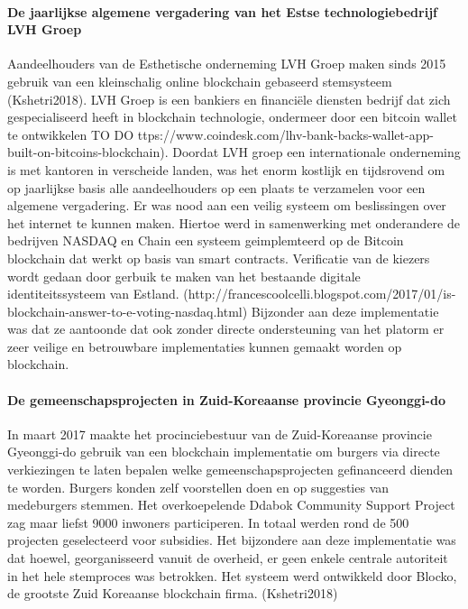 				\paragraph{De jaarlijkse algemene vergadering van het Estse technologiebedrijf LVH Groep}
				Aandeelhouders van de Esthetische onderneming LVH Groep maken sinds 2015 gebruik van een kleinschalig online blockchain gebaseerd stemsysteem (Kshetri2018). LVH Groep is een bankiers en financiële diensten bedrijf dat zich gespecialiseerd heeft in blockchain technologie, ondermeer door een bitcoin wallet te ontwikkelen TO DO ttps://www.coindesk.com/lhv-bank-backs-wallet-app-built-on-bitcoins-blockchain). Doordat LVH groep een internationale onderneming is met kantoren in verscheide landen, was het enorm kostlijk en tijdsrovend om op jaarlijkse basis alle aandeelhouders op een plaats te verzamelen voor een algemene vergadering. Er was  nood aan een veilig systeem om beslissingen over het internet te kunnen maken. Hiertoe werd in samenwerking met onderandere de bedrijven NASDAQ en Chain een systeem geimplemteerd op de Bitcoin blockchain dat werkt op basis van smart contracts. Verificatie van de kiezers wordt gedaan door gerbuik te maken van het bestaande digitale identiteitssysteem van Estland. (http://francescoolcelli.blogspot.com/2017/01/is-blockchain-answer-to-e-voting-nasdaq.html) Bijzonder aan deze implementatie was dat ze aantoonde dat ook zonder directe ondersteuning van het platorm er zeer veilige en betrouwbare implementaties kunnen gemaakt worden op blockchain.
				
				\paragraph{De gemeenschapsprojecten in Zuid-Koreaanse provincie Gyeonggi-do}
				In maart 2017 maakte het procinciebestuur van de Zuid-Koreaanse provincie Gyeonggi-do gebruik van een blockchain implementatie om burgers via directe verkiezingen te laten  bepalen welke gemeenschapsprojecten gefinanceerd dienden te worden. Burgers konden zelf voorstellen doen en op suggesties van medeburgers stemmen. Het overkoepelende Ddabok Community Support Project zag maar liefst 9000 inwoners participeren. In totaal werden rond de 500  projecten geselecteerd voor subsidies. Het bijzondere aan deze implementatie was dat hoewel, georganisseerd vanuit de overheid, er geen enkele centrale autoriteit in het hele stemproces was betrokken. Het systeem werd ontwikkeld door Blocko, de grootste Zuid Koreaanse blockchain firma. (Kshetri2018)
				
